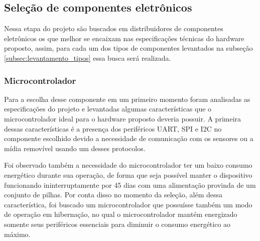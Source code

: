 \subsection{Seleção de componentes eletrônicos}

Nessa etapa do projeto são buscados em distribuidores de componentes eletrônicos os que melhor se encaixam nas especificações técnicas do hardware proposto, assim, para cada um dos tipos de componentes levantados na subseção \ref{subsec:levantamento_tipos} essa busca será realizada. 



\subsubsection{Microcontrolador}\label{subsubsec:esp32_modulo}


Para a escolha desse componente em um primeiro momento foram analisadas as especificações do projeto e levantadas algumas características que o microcontrolador ideal para o hardware proposto deveria possuir. A primeira dessas características é a presença dos periféricos \gls{UART}, \gls{SPI} e \gls{I2C} no componente escolhido devido a necessidade de comunicação com os sensores ou a mídia removível usando um desses protocolos.

Foi observado também a necessidade do microcontrolador ter um baixo consumo energético durante sua operação, de forma que seja possível manter o dispositivo funcionando ininterruptamente por 45 dias com uma alimentação provinda de um conjunto de pilhas. Por conta disso no momento da seleção, além dessa característica, foi buscado um microcontrolador que possuísse também um modo de operação em hibernação, no qual o microcontrolador mantém energizado somente seus periféricos essenciais para diminuir o consumo energético ao máximo. 

